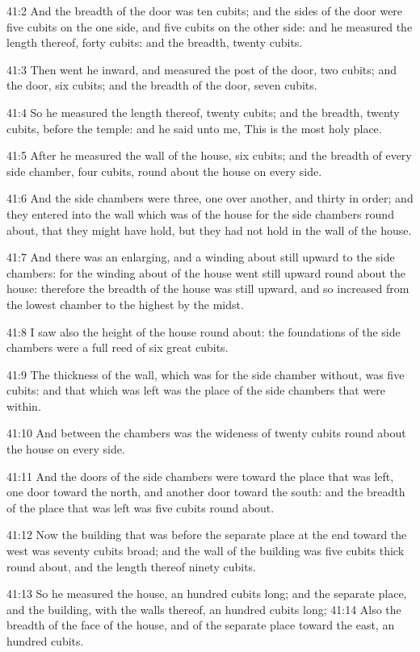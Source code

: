 41:2 And the breadth of the door was ten cubits; and the sides of the
door were five cubits on the one side, and five cubits on the other
side: and he measured the length thereof, forty cubits: and the
breadth, twenty cubits.

41:3 Then went he inward, and measured the post of the door, two
cubits; and the door, six cubits; and the breadth of the door, seven
cubits.

41:4 So he measured the length thereof, twenty cubits; and the
breadth, twenty cubits, before the temple: and he said unto me, This
is the most holy place.

41:5 After he measured the wall of the house, six cubits; and the
breadth of every side chamber, four cubits, round about the house on
every side.

41:6 And the side chambers were three, one over another, and thirty in
order; and they entered into the wall which was of the house for the
side chambers round about, that they might have hold, but they had not
hold in the wall of the house.

41:7 And there was an enlarging, and a winding about still upward to
the side chambers: for the winding about of the house went still
upward round about the house: therefore the breadth of the house was
still upward, and so increased from the lowest chamber to the highest
by the midst.

41:8 I saw also the height of the house round about: the foundations
of the side chambers were a full reed of six great cubits.

41:9 The thickness of the wall, which was for the side chamber
without, was five cubits: and that which was left was the place of the
side chambers that were within.

41:10 And between the chambers was the wideness of twenty cubits round
about the house on every side.

41:11 And the doors of the side chambers were toward the place that
was left, one door toward the north, and another door toward the
south: and the breadth of the place that was left was five cubits
round about.

41:12 Now the building that was before the separate place at the end
toward the west was seventy cubits broad; and the wall of the building
was five cubits thick round about, and the length thereof ninety
cubits.

41:13 So he measured the house, an hundred cubits long; and the
separate place, and the building, with the walls thereof, an hundred
cubits long; 41:14 Also the breadth of the face of the house, and of
the separate place toward the east, an hundred cubits.

